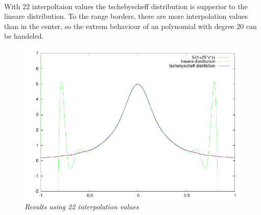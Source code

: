 \documentclass[11pt,a4paper,notitlepage,onecolumn]{article}
\begin{document}
\paragraph{}
With 22 interpoltaion values the tschebyscheff distribution is supperior 
to the lineare distribution. To the range borders, there are more 
interpolation values than in the center, so the extrem behaviour of an
polynomial with degree 20 can be handeled.


\begin{figure}
\centering
\includegraphics[width=\textwidth]{aufgabe3-2based22.pdf}
\caption{\em \small Results using 22 interpolation values}
\end{figure}
\end{document}
